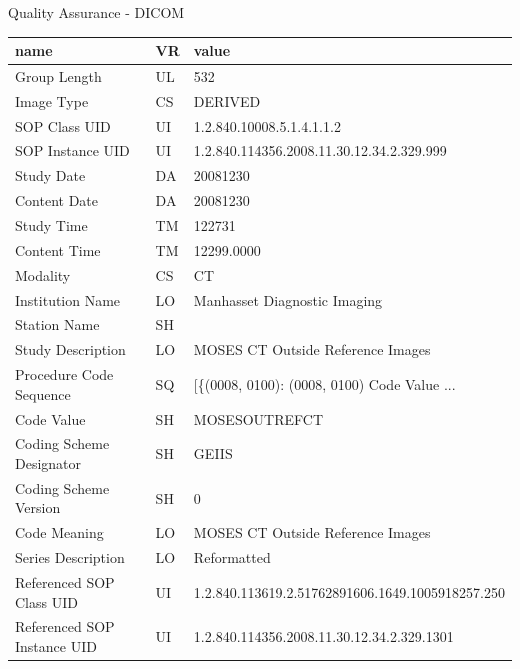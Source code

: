 \documentclass[10pt, xcolor=table]{beamer}
\begin{document}
\begin{frame}{Quality Assurance - DICOM}
\scriptsize
\begin{tabular}{lll}
\toprule
                        name &  VR &                                              value \\
\midrule
                Group Length &  UL &                                                532 \\
                  Image Type &  CS &                                            DERIVED \\
               SOP Class UID &  UI &                          1.2.840.10008.5.1.4.1.1.2 \\
            SOP Instance UID &  UI &          1.2.840.114356.2008.11.30.12.34.2.329.999 \\
                  Study Date &  DA &                                           20081230 \\
                Content Date &  DA &                                           20081230 \\
                  Study Time &  TM &                                             122731 \\
                Content Time &  TM &                                         12299.0000 \\
                    Modality &  CS &                                                 CT \\
            Institution Name &  LO &                       Manhasset Diagnostic Imaging \\
                Station Name &  SH &                                                    \\
           Study Description &  LO &                  MOSES CT Outside Reference Images \\
     Procedure Code Sequence &  SQ &  [\{(0008, 0100): (0008, 0100) Code Value       ... \\
                  Code Value &  SH &                                      MOSESOUTREFCT \\
    Coding Scheme Designator &  SH &                                              GEIIS \\
       Coding Scheme Version &  SH &                                                  0 \\
                Code Meaning &  LO &                  MOSES CT Outside Reference Images \\
          Series Description &  LO &                                        Reformatted \\
    Referenced SOP Class UID &  UI &   1.2.840.113619.2.51762891606.1649.1005918257.250 \\
 Referenced SOP Instance UID &  UI &         1.2.840.114356.2008.11.30.12.34.2.329.1301 \\
\bottomrule
\end{tabular}
\end{frame}
\end{document}
